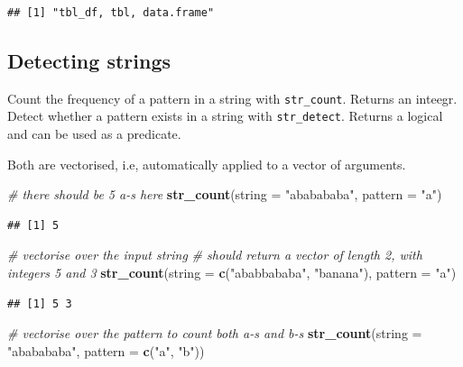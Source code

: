 \documentclass[]{book}
\newenvironment{Shaded}{}{}
\newcommand{\CommentTok}[1]{\textcolor[rgb]{0.38,0.63,0.69}{\textit{#1}}}
\newcommand{\DataTypeTok}[1]{\textcolor[rgb]{0.56,0.13,0.00}{#1}}
\newcommand{\KeywordTok}[1]{\textcolor[rgb]{0.00,0.44,0.13}{\textbf{#1}}}
\newcommand{\NormalTok}[1]{#1}
\newcommand{\StringTok}[1]{\textcolor[rgb]{0.25,0.44,0.63}{#1}}
\begin{document}
\begin{verbatim}
## [1] "tbl_df, tbl, data.frame"
\end{verbatim}

\hypertarget{detecting-strings}{%
\subsection{Detecting strings}\label{detecting-strings}}

Count the frequency of a pattern in a string with \texttt{str\_count}. Returns an inteegr.
Detect whether a pattern exists in a string with \texttt{str\_detect}. Returns a logical and can be used as a predicate.

Both are vectorised, i.e, automatically applied to a vector of arguments.

\begin{Shaded}
\begin{Highlighting}[]
\CommentTok{# there should be 5 a-s here}
\KeywordTok{str_count}\NormalTok{(}\DataTypeTok{string =} \StringTok{"ababababa"}\NormalTok{, }\DataTypeTok{pattern =} \StringTok{"a"}\NormalTok{)}
\end{Highlighting}
\end{Shaded}

\begin{verbatim}
## [1] 5
\end{verbatim}

\begin{Shaded}
\begin{Highlighting}[]
\CommentTok{# vectorise over the input string}
\CommentTok{# should return a vector of length 2, with integers 5 and 3}
\KeywordTok{str_count}\NormalTok{(}\DataTypeTok{string =} \KeywordTok{c}\NormalTok{(}\StringTok{"ababbababa"}\NormalTok{, }\StringTok{"banana"}\NormalTok{), }\DataTypeTok{pattern =} \StringTok{"a"}\NormalTok{)}
\end{Highlighting}
\end{Shaded}

\begin{verbatim}
## [1] 5 3
\end{verbatim}

\begin{Shaded}
\begin{Highlighting}[]
\CommentTok{# vectorise over the pattern to count both a-s and b-s}
\KeywordTok{str_count}\NormalTok{(}\DataTypeTok{string =} \StringTok{"ababababa"}\NormalTok{, }\DataTypeTok{pattern =} \KeywordTok{c}\NormalTok{(}\StringTok{"a"}\NormalTok{, }\StringTok{"b"}\NormalTok{))}
\end{Highlighting}
\end{Shaded}
\end{document}
